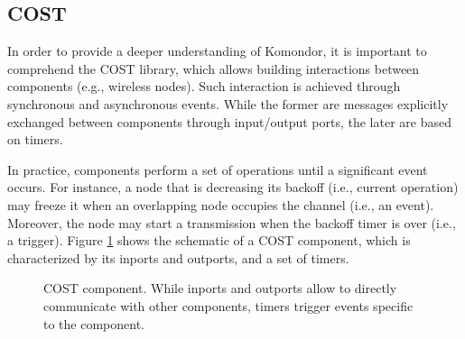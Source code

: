 \documentclass[a4paper]{article}
\begin{document}
	\subsection{COST}
	\label{section:cost}
	In order to provide a deeper understanding of Komondor, it is important to comprehend the COST library, which allows building interactions between components (e.g., wireless nodes). Such interaction is achieved through synchronous and asynchronous events. While the former are messages explicitly exchanged between components through input/output ports, the later are based on timers. 
	
	In practice, components perform a set of operations until a significant event occurs. For instance, a node that is decreasing its backoff (i.e., current operation) may freeze it when an overlapping node occupies the channel (i.e., an event). Moreover, the node may start a transmission when the backoff timer is over (i.e., a trigger). Figure \ref{fig:cost} shows the schematic of a COST component, which is characterized by its inports and outports, and a set of timers. 
	\begin{figure}[h!]
		\centering
		\caption{COST component. While inports and outports allow to directly communicate with other components, timers trigger events specific to the component.}
		\label{fig:cost}
	\end{figure}	
	
\end{document}
